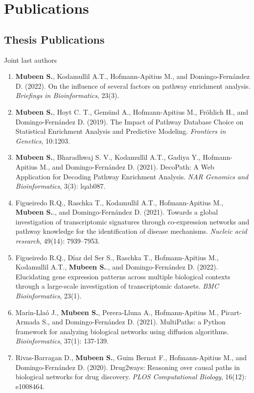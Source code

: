 \chapter*{Publications}

\section*{Thesis Publications}

\textsuperscript{\textdagger} Joint last authors

\begin{enumerate}

    \item \textbf{Mubeen S.}, Kodamullil A.T., Hofmann-Apitius M., and Domingo-Fern\'{a}ndez D. (2022). On the influence of several factors on pathway enrichment analysis. \textit{Briefings in Bioinformatics}, 23(3).
    \item \textbf{Mubeen S.}, Hoyt C. T., Gemünd A., Hofmann-Apitius M., Fröhlich H., and Domingo-Fern\'{a}ndez D. (2019). The Impact of Pathway Database Choice on Statistical Enrichment Analysis and Predictive Modeling. \textit{Frontiers in Genetics}, 10:1203.
    \item \textbf{Mubeen S.}, Bharadhwaj S. V., Kodamullil A.T., Gadiya Y., Hofmann-Apitius M., and Domingo-Fern\'{a}ndez D. (2021). DecoPath: A Web Application for Decoding Pathway Enrichment Analysis.  \textit{NAR Genomics and Bioinformatics}, 3(3): lqab087.
    \item Figueiredo R.Q., Raschka T., Kodamullil A.T., Hofmann-Apitius M., \textbf{Mubeen S.\textsuperscript{\textdagger}}., and Domingo-Fern\'{a}ndez D.\textsuperscript{\textdagger} (2021). Towards a global investigation of transcriptomic signatures through co-expression networks and pathway knowledge for the identification of disease mechanisms. \textit{Nucleic acid research}, 49(14): 7939–7953.
    \item Figueiredo R.Q., Díaz del Ser S., Raschka T., Hofmann-Apitius M., Kodamullil A.T., \textbf{Mubeen S.\textsuperscript{\textdagger}}., and Domingo-Fern\'{a}ndez D.\textsuperscript{\textdagger} (2022). Elucidating gene expression patterns across multiple biological contexts through a large-scale investigation of transcriptomic datasets. \textit{BMC Bioinformatics}, 23(1).
    \item Marín-Llaó J., \textbf{Mubeen S.}, Perera-Lluna A., Hofmann-Apitius M., Picart-Armada S.\textsuperscript{\textdagger}, and Domingo-Fern\'{a}ndez D.\textsuperscript{\textdagger} (2021). MultiPaths: a Python framework for analyzing biological networks using diffusion algorithms. \textit{Bioinformatics}, 37(1): 137-139.
    \item Rivas-Barragan D., \textbf{Mubeen S.}, Guim Bernat F., Hofmann-Apitius M., and Domingo-Fern\'{a}ndez D. (2020). Drug2ways: Reasoning over causal paths in biological networks for drug discovery. \textit{PLOS Computational Biology}, 16(12): e1008464.

\end{enumerate}

